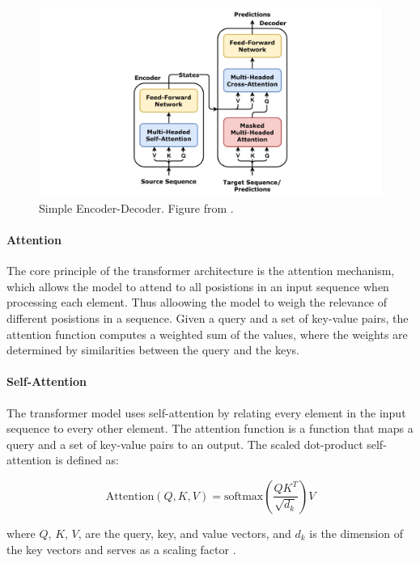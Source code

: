 \documentclass[lettersize,journal]{IEEEtran}
\begin{document}
\begin{figure}[t]
    \centering
    \includegraphics[width=\linewidth]{images/Transformer,_one_encoder-decoder_block.png}
    \caption{Simple Encoder-Decoder. Figure from \cite{godoy_dl_visuals}.}
    \label{fig:encoder_decoder}
\end{figure}

\paragraph{Attention}
The core principle of the transformer architecture is the attention mechanism, which allows the model to attend to all posistions in an input sequence when processing each element. Thus alloowing the model to weigh the relevance of different posistions in a sequence. Given a query and a set of key-value pairs, the attention function computes a weighted sum of the values, where the weights are determined by similarities between the query and the keys.

\paragraph{Self-Attention}
The transformer model uses self-attention by relating every element in the input sequence to every other element. The attention function is a function that maps a query and a set of key-value pairs to an output. The scaled dot-product self-attention is defined as:

\begin{equation}
    \text{Attention}(Q,K,V) = \text{softmax}\left(\frac{QK^T}{\sqrt{d_k}}\right)V
\end{equation}

\noindent where $Q$, $K$, $V$, are the query, key, and value vectors, and $d_k$ is the dimension of the key vectors and serves as a scaling factor \cite{vaswani2023attentionneed}. 
\end{document}
